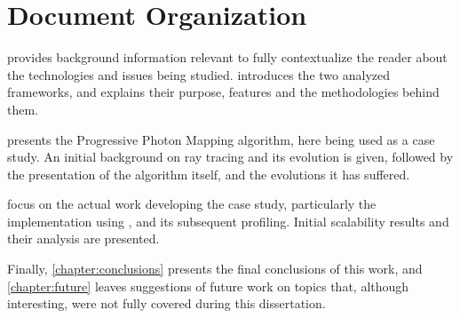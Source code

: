 \documentclass[main.tex]{subfiles}
\begin{document}
\section{Document Organization}

 provides background information relevant to fully contextualize the reader about the technologies and issues being studied.  introduces the two analyzed frameworks, and explains their purpose, features and the methodologies behind them.

 presents the Progressive Photon Mapping algorithm, here being used as a case study. An initial background on ray tracing and its evolution is given, followed by the presentation of the algorithm itself, and the evolutions it has suffered.

 focus on the actual work developing the case study, particularly the implementation using \starpu, and its subsequent profiling. Initial scalability results and their analysis are presented.

Finally, \cref{chapter:conclusions} presents the final conclusions of this work, and \cref{chapter:future} leaves suggestions of future work on topics that, although interesting, were not fully covered during this dissertation.
\end{document}
